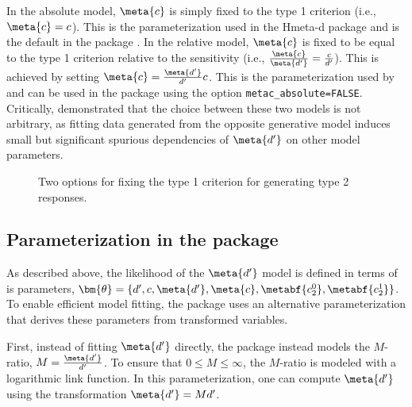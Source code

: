 In the {\sc absolute} model, $\meta{c}$ is simply fixed to the type 1 criterion (i.e., $\meta{c} = c$). This is the parameterization used in the Hmeta-d package and is the default in the \hmetad{} package \parencite{fleming2017}. In the {\sc relative} model, $\meta{c}$ is fixed to be equal to the type 1 criterion relative to the sensitivity (i.e., $\frac{\meta{c}}{\meta{d'}} = \frac{c}{d'}$). This is achieved by setting $\meta{c} = \frac{\meta{d'}}{d'}c$. This is the parameterization used by \textcite{maniscalco2012, maniscalco2014} and can be used in the \hmetad{} package using the option \texttt{metac\_absolute=FALSE}. Critically, \textcite{rausch2023} demonstrated that the choice between these two models is not arbitrary, as fitting data generated from the opposite generative model induces small but significant spurious dependencies of $\meta{d'}$ on other model parameters.

\begin{figure}
    \centering
    \caption{Two options for fixing the type 1 criterion for generating type 2 responses.}
    \label{fig:metac}
\end{figure}


\subsection{Parameterization in the \hmetad{} package}
As described above, the likelihood of the $\meta{d'}$ model is defined in terms of is parameters, $\bm{\theta} = \{d', c, \meta{d'}, \meta{c}, \metabf{c_2^0}, \metabf{c_2^1}\}$. To enable efficient model fitting, the \hmetad{} package uses an alternative parameterization that derives these parameters from transformed variables.

First, instead of fitting $\meta{d'}$ directly, the \hmetad{} package instead models the $M$-ratio, $M = \frac{\meta{d'}}{d'}$. To ensure that $0 \le M \le \infty$, the $M$-ratio is modeled with a logarithmic link function. In this parameterization, one can compute $\meta{d'}$ using the transformation $\meta{d'} = Md'$.


